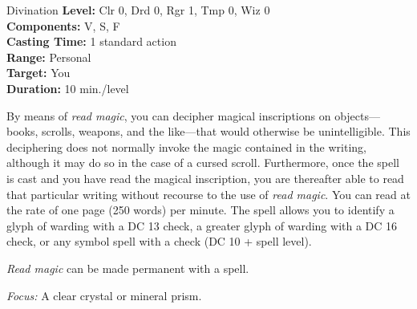 {Divination}
{
	\textbf{Level:}
	Clr 0, Drd 0, Rgr 1, Tmp 0, Wiz 0\\
	\textbf{Components:}
	V, S, F\\
	\textbf{Casting Time:}
	1 standard action\\
	\textbf{Range:}
	Personal\\
	\textbf{Target:}
	You\\
	\textbf{Duration:}
	10 min./level\\
}
{
	By means of \emph{read magic}, you can decipher magical inscriptions on objects---books, scrolls, weapons, and the like---that would otherwise be unintelligible. This deciphering does not normally invoke the magic contained in the writing, although it may do so in the case of a cursed scroll. Furthermore, once the spell is cast and you have read the magical inscription, you are thereafter able to read that particular writing without recourse to the use of \emph{read magic}. You can read at the rate of one page (250 words) per minute. The spell allows you to identify a glyph of warding with a DC 13  check, a greater glyph of warding with a DC 16  check, or any symbol spell with a  check (DC 10 + spell level).

	\emph{Read magic} can be made permanent with a  spell.

	\textit{Focus:}
	A clear crystal or mineral prism.

}
